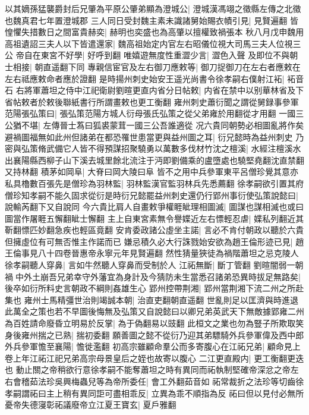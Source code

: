 以其嫡孫猛襲爵封后兄肇為平原公肇弟顯為澄城公|{
	澄城漢馮翊之徵縣左傳之北徵也魏真君七年置澄城郡}
三人同日受封魏主素未識諸舅始賜衣幘引見|{
	見賢遍翻}
皆惶懼失措數日之間富貴赫奕|{
	赫明也奕盛也為高肇以擅權致禍張本}
秋八月戊申魏用高祖遺詔三夫人以下皆遣還家|{
	魏高祖始定内官左右昭儀位視大司馬三夫人位視三公}
帝自在東宮不好學|{
	好呼到翻}
唯嬉遊無度性重澀少言|{
	澀色入聲}
及即位不與朝士相接|{
	朝直遥翻下同}
專親信宦官及左右御刀應敕等|{
	御刀捉御刀在左右者應敕在左右祗應敕命者應於證翻}
是時揚州刺史始安王遥光尚書令徐孝嗣右僕射江袥|{
	袥音石}
右將軍蕭坦之侍中江祀衛尉劉暄更直内省分日帖敕|{
	内省在禁中以别華林省及下省帖敕者於敕後聯紙書行所謂畫敕也更工衡翻}
雍州刺史蕭衍聞之謂從舅録事參軍范陽張弘策曰|{
	張弘策范陽方城人衍母張氏弘策之從父弟雍於用翻從才用翻}
一國三公猶不堪|{
	左傳晉士蒍曰狐裘蒙茸一國三公吾誰適從}
况六貴同朝勢必相圖亂將作矣避禍圖福無如此州但諸弟在都恐罹世患當更與益州圖之耳|{
	衍兄懿時為益州刺史}
乃密與弘策脩武備它人皆不得預謀招聚驍勇以萬數多伐材竹沈之檀溪|{
	水經注檀溪水出襄陽縣西柳子山下溪去城里餘北流注于沔即劉備乘的盧墮處也驍堅堯翻沈直禁翻又持林翻}
積茅如岡阜|{
	大脊曰岡大陵曰阜}
皆不之用中兵參軍東平呂僧珍覺其意亦私具櫓數百張先是僧珍為羽林監|{
	羽林監漢官監羽林兵先悉薦翻}
徐孝嗣欲引置其府僧珍知孝嗣不能久固求從衍是時衍兄懿罷益州刺史還仍行郢州事衍使弘策說懿曰|{
	說輸芮翻下又自說同}
今六貴比肩人自畫敕爭權睚眦理相圖滅|{
	圖謀也謀相滅也或曰圖當作屠睚五懈翻眦士懈翻}
主上自東宮素無令譽媟近左右慓輕忍虐|{
	媟私列翻近其靳翻慓匹妙翻急疾也輕區竟翻}
安肯委政諸公虛坐主諾|{
	言必不肯付朝政以聽於六貴但擁虛位有可無否惟主作諾而已}
嫌忌積久必大行誅戮始安欲為趙王倫形迹已見|{
	趙王倫事見八十四卷晉惠帝永寧元年見賢遍翻}
然性猜量狹徒為禍階蕭坦之忌克陵人徐孝嗣聽人穿鼻|{
	言如牛然聽人穿鼻而受制於人}
江祏無斷|{
	斷丁管翻}
劉暄闇弱一朝禍中外土崩吾兄弟幸守外藩宜為身計及今猜防未生當悉召諸弟恐異時拔足無路矣|{
	後卒如衍所料史言朝政不綱則姦雄生心}
郢州控帶荆湘|{
	郢州當荆湘下流二州之所赴集也}
雍州士馬精彊世治則竭誠本朝|{
	治直吏翻朝直遥翻}
世亂則足以匡濟與時進退此萬全之策也若不早圖後悔無及弘策又自說懿曰以卿兄弟英武天下無敵據郢雍二州為百姓請命廢昏立明易於反掌|{
	為于偽翻易以豉翻}
此桓文之業也勿為豎子所欺取笑身後雍州揣之已熟|{
	揣初委翻}
願善圖之懿不從衍乃迎其弟驃騎外兵參軍偉及西中郎外兵參軍憺至襄陽|{
	憺徙濫翻}
初高宗雖顧命羣公而多寄腹心在江祏兄弟|{
	顧命見上卷上年江祏江祀兄弟高宗母景皇后之姪也故寄以腹心}
二江更直殿内|{
	更工衡翻更迭也}
動止關之帝稍欲行意徐孝嗣不能奪蕭坦之時有異同而祏執制堅確帝深忿之帝左右會稽茹法珍吳興梅蟲兒等為帝所委任|{
	會工外翻茹音如}
祏常裁折之法珍等切齒徐孝嗣謂祏曰主上稍有異同詎可盡相乖反|{
	立異為乖不順指為反}
祏曰但以見付必無所憂帝失德寖彰祏議廢帝立江夏王寶玄|{
	夏戶雅翻}
